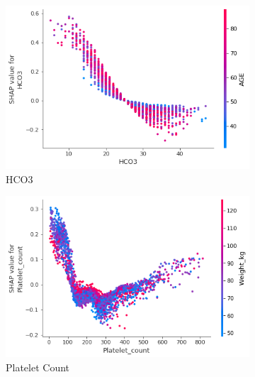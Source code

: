 \documentclass[12pt]{article}
\begin{document}
\begin{figure}[H]
     \centering
     \begin{subfigure}[b]{0.47\textwidth}
         \centering
         \includegraphics[width=\linewidth]{Vanilla SHAP Global/Vanilla SHAP Global for HCO3.png}
         \caption{HCO3}
     \end{subfigure}
     \hfill
     \begin{subfigure}[b]{0.47\textwidth}
         \centering
         \includegraphics[width=\linewidth]{Vanilla SHAP Global/Vanilla SHAP Global for Platelet_count.png}
         \caption{Platelet Count}
     \end{subfigure}
     \hfill
     \begin{subfigure}[b]{0.47\textwidth}
         \centering

\end{subfigure}
\end{figure}
\end{document}
